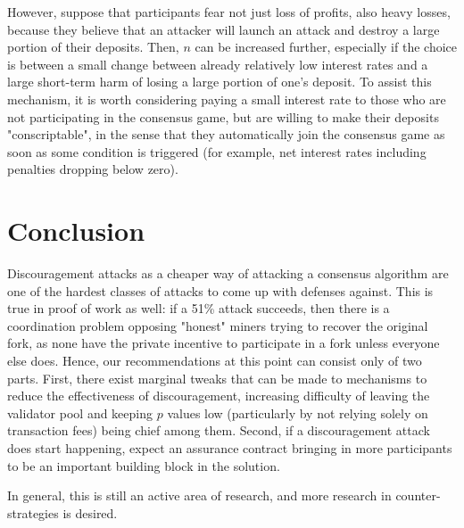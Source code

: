 \documentclass[12pt]{article}
\begin{document}
However, suppose that participants fear not just loss of profits, also heavy losses, because they believe that an attacker will launch an attack and destroy a large portion of their deposits. Then, $n$ can be increased further, especially if the choice is between a small change between already relatively low interest rates and a large short-term harm of losing a large portion of one's deposit. To assist this mechanism, it is worth considering paying a small interest rate to those who are not participating in the consensus game, but are willing to make their deposits "conscriptable", in the sense that they automatically join the consensus game as soon as some condition is triggered (for example, net interest rates including penalties dropping below zero).


\section{Conclusion}

Discouragement attacks as a cheaper way of attacking a consensus algorithm are one of the hardest classes of attacks to come up with defenses against. This is true in proof of work as well: if a 51\% attack succeeds, then there is a coordination problem opposing "honest" miners trying to recover the original fork, as none have the private incentive to participate in a fork unless everyone else does. Hence, our recommendations at this point can consist only of two parts. First, there exist marginal tweaks that can be made to mechanisms to reduce the effectiveness of discouragement, increasing difficulty of leaving the validator pool and keeping $p$ values low (particularly by not relying solely on transaction fees) being chief among them. Second, if a discouragement attack does start happening, expect an assurance contract bringing in more participants to be an important building block in the solution.

In general, this is still an active area of research, and more research in counter-strategies is desired.



\end{document}
